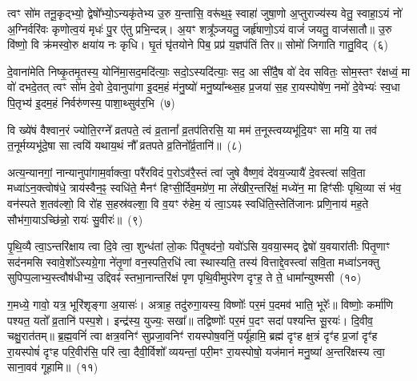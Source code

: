 {\anuvakamend[{अनी॑केना॒ष्टौ च॑}]}

त्वꣳ सो॑म तनू॒कृद्भ्यो॒ द्वेषो᳚भ्यो॒\-ऽन्यकृ॑तेभ्य उ॒रु य॒न्तासि॒ वरू॑थ॒ꣴ॒ स्वाहा॑ जुषा॒णो अ॒प्तुराज्य॑स्य वेतु॒ स्वाहा॒\-ऽयं नो॑ अ॒ग्निर्वरि॑वः कृणोत्व॒यं मृधः॑ पु॒र ए॑तु प्रभि॒न्दन्न्। अ॒यꣳ शत्रू᳚ञ्जयतु॒ जर्\mbox{}हृ॑षाणो॒\-ऽयं वाजं॑ जयतु॒ वाज॑सातौ॥ उ॒रु वि॑ष्णो॒ वि क्र॑मस्वो॒रु क्षया॑य नः कृधि। घृ॒तं घृ॑तयोने पिब॒ प्रप्र॑ य॒ज्ञप॑तिं तिर॥ सोमो॑ जिगाति गातु॒विद्~(६)\ip

दे॒वाना॑मेति निष्कृ॒तमृ॒तस्य॒ योनि॑मा॒सद॒मदि॑त्याः॒ सदो॒\-ऽस्यदि॑त्याः॒ सद॒ आ सी॑दै॒ष वो॑ देव सवितः॒ सोम॒स्तꣳ र॑क्षध्वं॒ मा वो॑ दभदे॒तत् त्वꣳ सो॑म दे॒वो दे॒वानुपा॑गा इ॒दम॒हं म॑नु॒ष्यो॑ मनु॒ष्या᳚न्थ्स॒ह प्र॒जया॑ स॒ह रा॒यस्पोषे॑ण॒ नमो॑ दे॒वेभ्यः॑ स्व॒धा पि॒तृभ्य॑ इ॒दम॒हं निर्वरु॑णस्य॒ पाशा॒थ्सुव॑र॒भि~(७)\ip

वि ख्ये॑षं वैश्वान॒रं ज्योति॒रग्ने᳚ व्रतपते॒ त्वं व्र॒तानां᳚ व्र॒तप॑तिरसि॒ या मम॑ त॒नूस्त्वय्यभू॑दि॒यꣳ सा मयि॒ या तव॑ त॒नूर्मय्यभू॑दे॒षा सा त्वयि॑ यथाय॒थं नौ᳚ व्रतपते व्र॒तिनो᳚र्व्र॒तानि॑॥~(८)\ip

{\anuvakamend[{गा॒तु॒विद॒भ्येक॑त्रिꣳशच्च}]}

अत्य॒न्यानगां॒ नान्यानुपा॑गाम॒र्वाक्त्वा॒ परै॑रविदं प॒रो\-ऽव॑रै॒स्तं त्वा॑ जुषे वैष्ण॒वं दे॑वय॒ज्यायै॑ दे॒वस्त्वा॑ सवि॒ता मध्वा॑\-ऽन॒क्त्वोष॑धे॒ त्राय॑स्वैन॒ꣴ॒ स्वधि॑ते॒ मैनꣳ॑ हिꣳसी॒र्दिव॒मग्रे॑ण॒ मा ले॑खीर॒न्तरि॑क्षं॒ मध्ये॑न॒ मा हिꣳ॑सीः पृथि॒व्या सं भ॑व॒ वन॑स्पते श॒तव॑ल्\mbox{}शो॒ वि रो॑ह स॒हस्र॑वल्\mbox{}शा॒ वि व॒यꣳ रु॑हेम॒ यं त्वा॒\-ऽयꣴ स्वधि॑ति॒स्तेति॑जानः प्रणि॒नाय॑ मह॒ते सौभ॑गा॒या\-ऽच्छि॑न्नो॒ रायः॑ सु॒वीरः॑॥~(९)\ip

{\anuvakamend[{यं दश॑ च}]}

पृ॒थि॒व्यै त्वा॒\-ऽन्तरि॑क्षाय त्वा दि॒वे त्वा॒ शुन्ध॑तां लो॒कः पि॑तृ॒षद॑नो॒ यवो॑\-ऽसि य॒वया॒स्मद् द्वेषो॑ य॒वयारा॑तीः पितृ॒णाꣳ सद॑नमसि स्वावे॒शो᳚\-ऽस्यग्रे॒गा ने॑तृ॒णां वन॒स्पति॒रधि॑ त्वा स्थास्यति॒ तस्य॑ वित्ताद्दे॒वस्त्वा॑ सवि॒ता मध्वा॑\-ऽनक्तु सुपिप्प॒लाभ्य॒स्त्वौष॑धीभ्य॒ उद्दिवꣴ॑ स्तभा॒नान्तरि॑क्षं पृण पृथि॒वीमुप॑रेण दृꣳह॒ ते ते॒ धामा᳚न्युश्मसी~(१०)\ip

ग॒मध्ये॒ गावो॒ यत्र॒ भूरि॑शृङ्गा अ॒यासः॑। अत्राह॒ तदु॑रुगा॒यस्य॒ विष्णोः᳚ पर॒मं प॒दमव॑ भाति॒ भूरेः᳚॥ विष्णोः॒ कर्मा॑णि पश्यत॒ यतो᳚ व्र॒तानि॑ पस्प॒शे। इन्द्र॑स्य॒ युज्यः॒ सखा᳚॥ तद्विष्णोः᳚ पर॒मं प॒दꣳ सदा॑ पश्यन्ति सू॒रयः॑। दि॒वीव॒ चक्षु॒रात॑तम्॥ ब्र॒ह्म॒वनिं॑ त्वा क्षत्र॒वनिꣳ॑ सुप्रजा॒वनिꣳ॑ रायस्पोष॒वनिं॒ पर्यू॑हामि॒ ब्रह्म॑ दृꣳह क्ष॒त्रं दृꣳ॑ह प्र॒जां दृꣳ॑ह रा॒यस्पोषं॑ दृꣳह परि॒वीर॑सि॒ परि॑ त्वा॒ दैवी॒र्विशो᳚ व्ययन्तां॒ परी॒मꣳ रा॒यस्पोषो॒ यज॑मानं मनु॒ष्या॑ अ॒न्त\-रि॑क्षस्य त्वा॒ साना॒वव॑ गूहामि॥~(११)\ip

